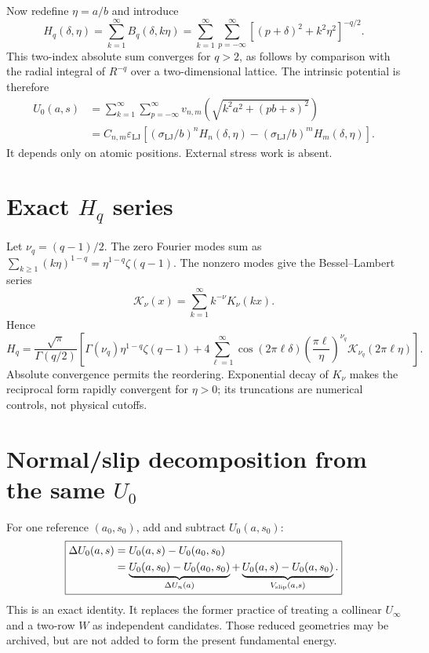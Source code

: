 \documentclass[11pt,letterpaper]{article}
\newcommand{\epsLJ}{\varepsilon_{\mathrm{LJ}}}
\newcommand{\sigLJ}{\sigma_{\mathrm{LJ}}}
\begin{document}
Now redefine $\eta=a/b$ and introduce
\begin{equation}
 \boxed{H_q(\delta,\eta)=\sum_{k=1}^{\infty}B_q(\delta,k\eta)
 =\sum_{k=1}^{\infty}\sum_{p=-\infty}^{\infty}
 [(p+\delta)^2+k^2\eta^2]^{-q/2}.}
 \label{eq:Hdirect}
\end{equation}
This two-index absolute sum converges for $q>2$, as follows by comparison
with the radial integral of $R^{-q}$ over a two-dimensional lattice.  The
intrinsic potential is therefore
\begin{equation}
 \boxed{\begin{aligned}
 U_0(a,s)&=\sum_{k=1}^{\infty}\sum_{p=-\infty}^{\infty}
 v_{n,m}\!\left(\sqrt{k^2a^2+(pb+s)^2}\right)\\
 &=C_{n,m}\epsLJ\left[(\sigLJ/b)^nH_n(\delta,\eta)-
 (\sigLJ/b)^mH_m(\delta,\eta)\right].
 \end{aligned}}
 \label{eq:U0H}
\end{equation}
It depends only on atomic positions.  External stress work is absent.

\section{Exact $H_q$ series}

Let $\nu_q=(q-1)/2$.  The zero Fourier modes sum as
$\sum_{k\ge1}(k\eta)^{1-q}=\eta^{1-q}\zeta(q-1)$.  The nonzero modes give the
Bessel--Lambert series
\begin{equation}
 \boxed{\mathcal K_\nu(x)=\sum_{k=1}^{\infty}k^{-\nu}K_\nu(kx).}
 \label{eq:Klambert}
\end{equation}
Hence
\begin{equation}
\boxed{H_q=\frac{\sqrt\pi}{\Gamma(q/2)}\left[
 \Gamma(\nu_q)\eta^{1-q}\zeta(q-1)
 +4\sum_{\ell=1}^{\infty}\cos(2\pi\ell\delta)
 \left(\frac{\pi\ell}{\eta}\right)^{\nu_q}
 \mathcal K_{\nu_q}(2\pi\ell\eta)\right].}
\label{eq:Hexact}
\end{equation}
Absolute convergence permits the reordering.  Exponential decay of $K_\nu$
makes the reciprocal form rapidly convergent for $\eta>0$; its truncations are
numerical controls, not physical cutoffs.

\section{Normal/slip decomposition from the same $U_0$}
\label{sec:decomp}

For one reference $(a_0,s_0)$, add and subtract $U_0(a,s_0)$:
\begin{equation}
\boxed{\begin{aligned}
 \Delta U_0(a,s)&=U_0(a,s)-U_0(a_0,s_0)\\
 &=\underbrace{U_0(a,s_0)-U_0(a_0,s_0)}_{\Delta U_n(a)}
 +\underbrace{U_0(a,s)-U_0(a,s_0)}_{V_{\rm slip}(a,s)}.
\end{aligned}}
\label{eq:decomp}
\end{equation}
This is an exact identity.  It replaces the former practice of treating a
collinear $U_\infty$ and a two-row $W$ as independent candidates.  Those
reduced geometries may be archived, but are not added to form the present
fundamental energy.
\end{document}
